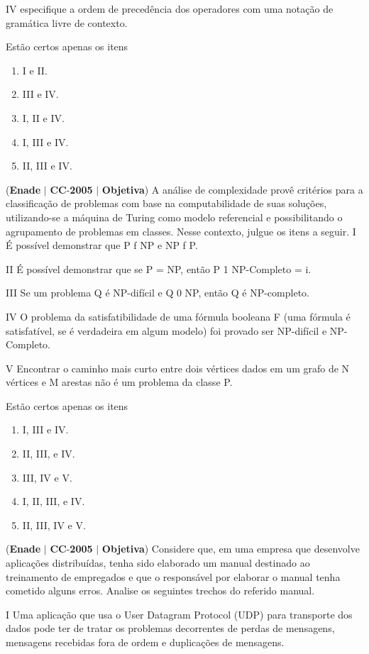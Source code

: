 \documentclass{exam}
\begin{document}
\begin{questions}
IV especifique a ordem de precedência dos operadores com uma
notação de gramática livre de contexto.

Estão certos apenas os itens
	\begin{enumerate}[label=\alph*)]
		\item  I e II. 
		\item  III e IV. 
		\item  I, II e IV.
		\item  I, III e IV.
		\item  II, III e IV.
	\end{enumerate}

\question (\textbf{Enade} $|$ \textbf{CC}-\textbf{2005} $|$ \textbf{Objetiva})
A análise de complexidade provê critérios para a classificação
de problemas com base na computabilidade de suas soluções,
utilizando-se a máquina de Turing como modelo referencial e
possibilitando o agrupamento de problemas em classes. Nesse
contexto, julgue os itens a seguir.
I É possível demonstrar que P f NP e NP f P.

II É possível demonstrar que se P = NP, então
P 1 NP-Completo = i.

III Se um problema Q é NP-difícil e Q 0 NP, então Q é
NP-completo.

IV O problema da satisfatibilidade de uma fórmula booleana F
(uma fórmula é satisfatível, se é verdadeira em algum
modelo) foi provado ser NP-difícil e NP-Completo.

V Encontrar o caminho mais curto entre dois vértices dados
em um grafo de N vértices e M arestas não é um problema
da classe P.

Estão certos apenas os itens
	\begin{enumerate}[label=\alph*)]
		\item  I, III e IV.
		\item  II, III, e IV.
		\item  III, IV e V.
		\item  I, II, III, e IV.
		\item  II, III, IV e V.
	\end{enumerate}

\question (\textbf{Enade} $|$ \textbf{CC}-\textbf{2005} $|$ \textbf{Objetiva})
Considere que, em uma empresa que desenvolve aplicações
distribuídas, tenha sido elaborado um manual destinado ao
treinamento de empregados e que o responsável por elaborar o
manual tenha cometido alguns erros. Analise os seguintes
trechos do referido manual.

I Uma aplicação que usa o User Datagram Protocol (UDP)
para transporte dos dados pode ter de tratar os problemas
decorrentes de perdas de mensagens, mensagens recebidas
fora de ordem e duplicações de mensagens.


\end{questions}
\end{document}
